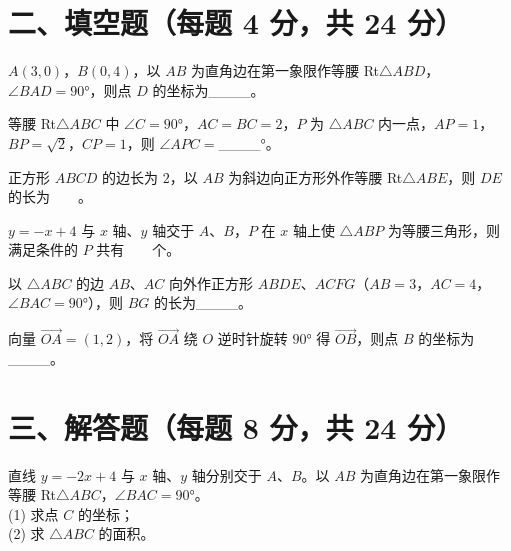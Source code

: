 \documentclass{exam-zh}
\newcommand{\answerarea}[1][40mm]{%
  \vspace{2mm}%
  \begin{tcolorbox}[
    enhanced, breakable,
    colback=white,
    colframe=white,
    boxrule=0pt,
    height=#1,
    valign=top,
    bottom=0mm,
    after skip=0mm,
  ]
  \end{tcolorbox}%
}
\begin{document}
\section*{二、填空题（每题 4 分，共 24 分）}


\begin{question}[points=4]
  $A(3, 0)$，$B(0, 4)$，以 $AB$ 为直角边在第一象限作等腰 Rt$\triangle ABD$，$\angle BAD = 90°$，则点 $D$ 的坐标为\_\_\_\_。
  \fillin
\end{question}



\begin{question}[points=4]
  等腰 Rt$\triangle ABC$ 中 $\angle C = 90°$，$AC = BC = 2$，$P$ 为 $\triangle ABC$ 内一点，$AP = 1$，$BP = \sqrt{2}$，$CP = 1$，则 $\angle APC = $\_\_\_\_$°$。
  \fillin
\end{question}



\begin{question}[points=4]
  正方形 $ABCD$ 的边长为 $2$，以 $AB$ 为斜边向正方形外作等腰 Rt$\triangle ABE$，则 $DE$ 的长为    。
  \fillin
\end{question}



\begin{question}[points=4]
  $y = -x + 4$ 与 $x$ 轴、$y$ 轴交于 $A$、$B$，$P$ 在 $x$ 轴上使 $\triangle ABP$ 为等腰三角形，则满足条件的 $P$ 共有    个。
  \fillin
\end{question}



\begin{question}[points=4]
  以 $\triangle ABC$ 的边 $AB$、$AC$ 向外作正方形 $ABDE$、$ACFG$（$AB = 3$，$AC = 4$，$\angle BAC = 90°$），则 $BG$ 的长为\_\_\_\_。
  \fillin
\end{question}



\begin{question}[points=4]
  向量 $\overrightarrow{OA} = (1, 2)$，将 $\overrightarrow{OA}$ 绕 $O$ 逆时针旋转 $90°$ 得 $\overrightarrow{OB}$，则点 $B$ 的坐标为\_\_\_\_。
  \fillin
\end{question}


\section*{三、解答题（每题 8 分，共 24 分）}


\begin{problem}[points=8]
  直线 $y = -2x + 4$ 与 $x$ 轴、$y$ 轴分别交于 $A$、$B$。以 $AB$ 为直角边在第一象限作等腰 Rt$\triangle ABC$，$\angle BAC = 90°$。\\
(1) 求点 $C$ 的坐标；\\
(2) 求 $\triangle ABC$ 的面积。

  \answerarea[70mm]
\end{problem}
\end{document}
